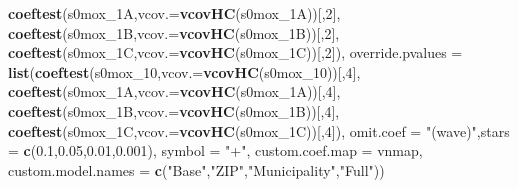 \documentclass[
]{article}
\newenvironment{Shaded}{\begin{snugshade}}{\end{snugshade}}
\newcommand{\DataTypeTok}[1]{\textcolor[rgb]{0.13,0.29,0.53}{#1}}
\newcommand{\DecValTok}[1]{\textcolor[rgb]{0.00,0.00,0.81}{#1}}
\newcommand{\FloatTok}[1]{\textcolor[rgb]{0.00,0.00,0.81}{#1}}
\newcommand{\KeywordTok}[1]{\textcolor[rgb]{0.13,0.29,0.53}{\textbf{#1}}}
\newcommand{\NormalTok}[1]{#1}
\newcommand{\StringTok}[1]{\textcolor[rgb]{0.31,0.60,0.02}{#1}}
\begin{document}
\begin{Shaded}
\begin{Highlighting}[]
                             \KeywordTok{coeftest}\NormalTok{(s0mox_1A,}\DataTypeTok{vcov.=}\KeywordTok{vcovHC}\NormalTok{(s0mox_1A))[,}\DecValTok{2}\NormalTok{],}
                             \KeywordTok{coeftest}\NormalTok{(s0mox_1B,}\DataTypeTok{vcov.=}\KeywordTok{vcovHC}\NormalTok{(s0mox_1B))[,}\DecValTok{2}\NormalTok{],}
                             \KeywordTok{coeftest}\NormalTok{(s0mox_1C,}\DataTypeTok{vcov.=}\KeywordTok{vcovHC}\NormalTok{(s0mox_1C))[,}\DecValTok{2}\NormalTok{]),}
          \DataTypeTok{override.pvalues =} \KeywordTok{list}\NormalTok{(}\KeywordTok{coeftest}\NormalTok{(s0mox_}\DecValTok{10}\NormalTok{,}\DataTypeTok{vcov.=}\KeywordTok{vcovHC}\NormalTok{(s0mox_}\DecValTok{10}\NormalTok{))[,}\DecValTok{4}\NormalTok{],}
                                  \KeywordTok{coeftest}\NormalTok{(s0mox_1A,}\DataTypeTok{vcov.=}\KeywordTok{vcovHC}\NormalTok{(s0mox_1A))[,}\DecValTok{4}\NormalTok{],}
                                  \KeywordTok{coeftest}\NormalTok{(s0mox_1B,}\DataTypeTok{vcov.=}\KeywordTok{vcovHC}\NormalTok{(s0mox_1B))[,}\DecValTok{4}\NormalTok{],}
                                  \KeywordTok{coeftest}\NormalTok{(s0mox_1C,}\DataTypeTok{vcov.=}\KeywordTok{vcovHC}\NormalTok{(s0mox_1C))[,}\DecValTok{4}\NormalTok{]),}
          \DataTypeTok{omit.coef =} \StringTok{"(wave)"}\NormalTok{,}\DataTypeTok{stars =} \KeywordTok{c}\NormalTok{(}\FloatTok{0.1}\NormalTok{,}\FloatTok{0.05}\NormalTok{,}\FloatTok{0.01}\NormalTok{,}\FloatTok{0.001}\NormalTok{), }\DataTypeTok{symbol =} \StringTok{"+"}\NormalTok{,}
          \DataTypeTok{custom.coef.map =}\NormalTok{ vnmap, }
          \DataTypeTok{custom.model.names =} \KeywordTok{c}\NormalTok{(}\StringTok{"Base"}\NormalTok{,}\StringTok{"ZIP"}\NormalTok{,}\StringTok{"Municipality"}\NormalTok{,}\StringTok{"Full"}\NormalTok{))}
\end{Highlighting}
\end{Shaded}
\end{document}
